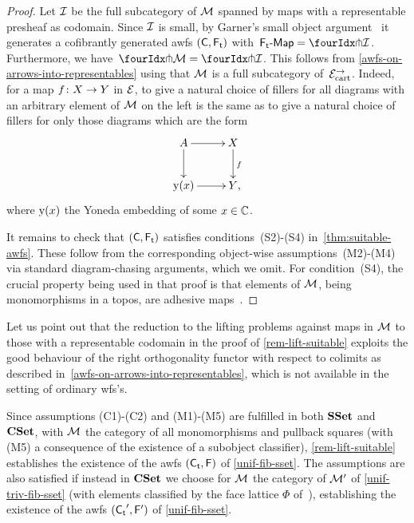 \documentclass[reqno,10pt,a4paper,oneside,draft]{amsart}
\begin{document}
{{\begin{proof}
Let $\cal{I}$ be the full subcategory of $\cal{M}$ spanned by maps with a representable presheaf as codomain.
Since $\cal{I}$ is small, by Garner's small object argument~\cite{garner:small-object-argument} it generates a cofibrantly generated awfs $(\CC, \TF)$ with~$\pAlg{\TF} = \liftr{\cal{I}}$.
Furthermore, we have~$\liftr{\cal{M}} = \liftr{\cal{I}}$.
This follows from \cref{awfs-on-arrows-into-representables} using that $\cal{M}$ is a full subcategory of~$\cal{E}^\to_\cart$.
Indeed, for a map $f \co X \to Y$ in $\catE$, to give a natural choice of fillers for all diagrams with an arbitrary element of $\cal{M}$ on the left is the same as to give a natural choice of fillers for only those diagrams which are the form
\[
\xymatrix{
  A
  \ar[r]
  \ar[d]
&
  X
  \ar[d]^f
\\
  \yon(x)
  \ar[r]
&
  Y
\rlap{,}}
\]
where $\yon(x)$ the Yoneda embedding of some $x \in \catC$.

It remains to check that $(\CC, \TF)$ satisfies conditions~(S2)-(S4) in~\cref{thm:suitable-awfs}.
These follow from the corresponding object-wise assumptions~(M2)-(M4) via standard diagram-chasing arguments, which we omit.
For condition~(S4), the crucial property being used in that proof is that elements of $\cal{M}$, being monomorphisms in a topos, are adhesive maps~\cite{garner-lack:adhesive}.
\end{proof}

\begin{remark}
\label{rem:colimit-decomp}
Let us point out that the reduction to the lifting problems against maps in $\cal{M}$ to those with a representable codomain in the proof of \cref{rem-lift-suitable} exploits the good behaviour of the right orthogonality functor with respect to colimits as described in~\cref{awfs-on-arrows-into-representables}, which is not available in the setting of ordinary wfs's.
\end{remark}

\begin{example} \label{justify-sset-cset-examples}
Since assumptions (C1)-(C2) and (M1)-(M5) are fulfilled in both $\SSet$ and~$\CSet$, with $\cal{M}$ the category of all monomorphisms and pullback squares (with (M5) a consequence of the existence of a subobject classifier), \cref{rem-lift-suitable} establishes the existence of the awfs $(\TC, \FF)$ of \cref{unif-fib-sset}.
The assumptions are also satisfied if instead in $\CSet$ we choose for $\cal{M}$ the category of $\cal{M}'$ of \cref{unif-triv-fib-sset} (with elements classified by the face lattice $\Phi$ of~\cite{cohen-et-al:cubicaltt}), establishing the existence of the awfs $(\TC', \FF')$ of \cref{unif-fib-sset}.
\end{example}

}}
\end{document}
